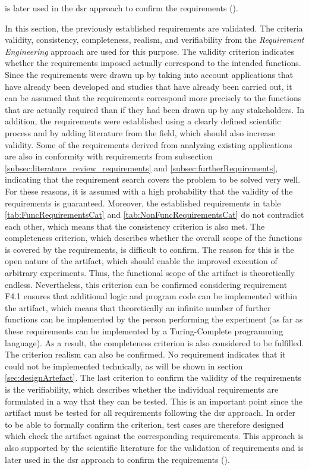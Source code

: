 is later used in the \ac{dsr} approach to confirm the requirements (\cite{Sommerville.2011}).

In this section, the previously established requirements are validated. The criteria validity, consistency, completeness, realism, and verifiability from the \textit{Requirement Engineering} approach are used for this purpose. The validity criterion indicates whether the requirements imposed actually correspond to the intended functions. Since the requirements were drawn up by taking into account applications that have already been developed and studies that have already been carried out, it can be assumed that the requirements correspond more precisely to the functions that are actually required than if they had been drawn up by any stakeholders. In addition, the requirements were established using a clearly defined scientific process and by adding literature from the field, which should also increase validity. Some of the requirements derived from analyzing existing applications are also in conformity with requirements from subsection \ref{subsec:literature_review_requirements} and \ref{subsec:furtherRequirements}, indicating that the requirement search covers the problem to be solved very well. For these reasons, it is assumed with a high probability that the validity of the requirements is guaranteed. Moreover, the established requirements in table \ref{tab:FuncRequirementsCat} and \ref{tab:NonFuncRequirementsCat} do not contradict each other, which means that the consistency criterion is also met. The completeness criterion, which describes whether the overall scope of the functions is covered by the requirements, is difficult to confirm. The reason for this is the open nature of the artifact, which should enable the improved execution of arbitrary experiments. Thus, the functional scope of the artifact is theoretically endless. Nevertheless, this criterion can be confirmed considering requirement F4.1 ensures that additional logic and program code can be implemented within the artifact, which means that theoretically an infinite number of further functions can be implemented by the person performing the experiment (as far as these requirements can be implemented by a Turing-Complete programming language). As a result, the completeness criterion is also considered to be fulfilled. The criterion realism can also be confirmed. No requirement indicates that it could not be implemented technically, as will be shown in section \ref{sec:designArtefact}. The last criterion to confirm the validity of the requirements is the verifiability, which describes whether the individual requirements are formulated in a way that they can be tested. This is an important point since the artifact must be tested for all requirements following the \ac{dsr} approach. In order to be able to formally confirm the criterion, test cases are therefore designed which check the artifact against the corresponding requirements. This approach is also supported by the scientific literature for the validation of requirements and is later used in the \ac{dsr} approach to confirm the requirements (\cite{Sommerville.2011}).


